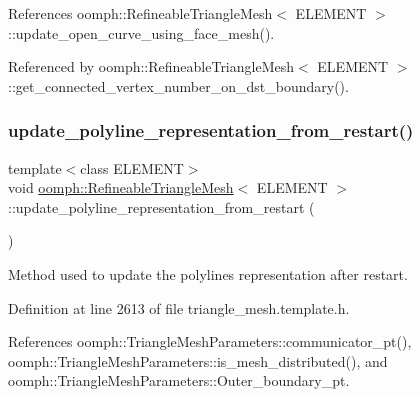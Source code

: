 References oomph\+::\+Refineable\+Triangle\+Mesh$<$ E\+L\+E\+M\+E\+N\+T $>$\+::update\+\_\+open\+\_\+curve\+\_\+using\+\_\+face\+\_\+mesh().



Referenced by oomph\+::\+Refineable\+Triangle\+Mesh$<$ E\+L\+E\+M\+E\+N\+T $>$\+::get\+\_\+connected\+\_\+vertex\+\_\+number\+\_\+on\+\_\+dst\+\_\+boundary().

\mbox{\label{classoomph_1_1RefineableTriangleMesh_a26cdfda4b77158dd24641cb5889ad2ff}} 
\subsubsection{\texorpdfstring{update\+\_\+polyline\+\_\+representation\+\_\+from\+\_\+restart()}{update\_polyline\_representation\_from\_restart()}}
{\footnotesize\ttfamily template$<$class E\+L\+E\+M\+E\+NT$>$ \\
void \hyperlink{classoomph_1_1RefineableTriangleMesh}{oomph\+::\+Refineable\+Triangle\+Mesh}$<$ E\+L\+E\+M\+E\+NT $>$\+::update\+\_\+polyline\+\_\+representation\+\_\+from\+\_\+restart (\begin{DoxyParamCaption}{ }\end{DoxyParamCaption})\hspace{0.3cm}{\ttfamily [inline]}}



Method used to update the polylines representation after restart. 



Definition at line 2613 of file triangle\+\_\+mesh.\+template.\+h.



References oomph\+::\+Triangle\+Mesh\+Parameters\+::communicator\+\_\+pt(), oomph\+::\+Triangle\+Mesh\+Parameters\+::is\+\_\+mesh\+\_\+distributed(), and oomph\+::\+Triangle\+Mesh\+Parameters\+::\+Outer\+\_\+boundary\+\_\+pt.

\mbox{\label{classoomph_1_1RefineableTriangleMesh_a42bd18f8738951f58bf755085ebb71c2}} 
